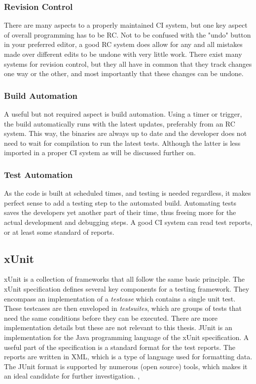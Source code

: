 \documentclass[11pt,british]{article}
\begin{document}
\subsubsection{Revision Control}
There are many aspects to a properly maintained \gls{CI} system, but one key aspect of overall programming has to be \gls{RC}. Not to be confused with the "undo" button in your preferred editor, a good \gls{RC} system does allow for any and all mistakes made over different edits to be undone with very little work. There exist many systems for revision control, but they all have in common that they track changes one way or the other, and most importantly that these changes can be undone. 

\subsubsection{Build Automation}
A useful but not required aspect is build automation. Using a timer or trigger, the build automatically runs with the latest updates, preferably from an \gls{RC} system. This way, the binaries are always up to date and the developer does not need to wait for compilation to run the latest tests. Although the latter is less imported in a proper \gls{CI} system as will be discussed further on. 

\subsubsection{Test Automation}
As the code is built at scheduled times, and testing is needed regardless, it makes perfect sense to add a testing step to the automated build. Automating tests saves the developers yet another part of their time, thus freeing more for the actual development and debugging steps. A good \gls{CI} system can read test reports, or at least some standard of reports. 

\subsection{xUnit}
\label{subsec:xUnit}
xUnit is a collection of frameworks that all follow the same basic principle. The xUnit specification defines several key components for a testing framework. They encompass an implementation of a \emph{testcase} which contains a single unit test. These testcases are then enveloped in \emph{testsuites}, which are groups of tests that need the same conditions before they can be executed.  There are more implementation details but these are not relevant to this thesis. JUnit is an implementation for the Java programming language of the xUnit specification. A useful part of the specification is a standard format for the test reports. The reports are written in \gls{XML}, which is a type of language used for formatting data. The JUnit format is supported by numerous (open source) tools, which makes it an ideal candidate for further investigation. \cite{xunit}, \cite{junitxml}
\end{document}
